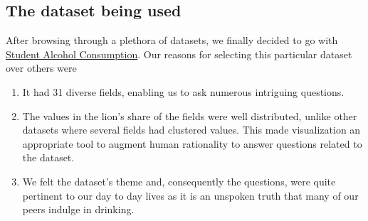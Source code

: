 \documentclass[titlepage, 12pt]{article}
\begin{document}
\subsection{The dataset being used}
After browsing through a plethora of datasets, we finally decided to go with
\href{https://www.kaggle.com/uciml/student-alcohol-consumption/data}{Student
Alcohol Consumption}. Our reasons for selecting this particular dataset over
others were
\begin{enumerate}

    \item It had 31 diverse fields, enabling us to ask numerous intriguing
        questions.

    \item The values in the lion's share of the fields were well distributed,
        unlike other datasets where several fields had clustered values. This
        made visualization an appropriate tool to augment human rationality to
        answer questions related to the dataset.

    \item We felt the dataset's theme and, consequently the questions, were
        quite pertinent to our day to day lives as it is an unspoken truth that
        many of our peers indulge in drinking.

\end{enumerate}
\end{document}

